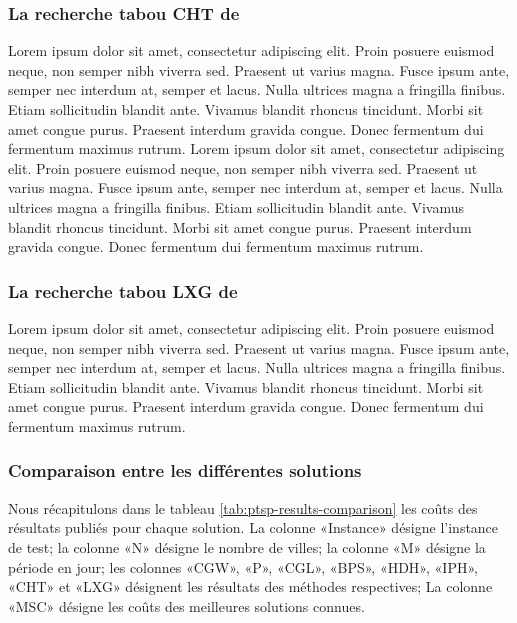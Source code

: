 \medskip


\subsubsection{La recherche tabou CHT de \parencite{cacchiani_set-covering_2014}}
Lorem ipsum dolor sit amet, consectetur adipiscing elit. Proin posuere euismod neque, non semper nibh viverra sed. Praesent ut varius magna. Fusce ipsum ante, semper nec interdum at, semper et lacus. Nulla ultrices magna a fringilla finibus. Etiam sollicitudin blandit ante. Vivamus blandit rhoncus tincidunt. Morbi sit amet congue purus. Praesent interdum gravida congue. Donec fermentum dui fermentum maximus rutrum. \parencite{hemmelmayr_variable_2009} Lorem ipsum dolor sit amet, consectetur adipiscing elit. Proin posuere euismod neque, non semper nibh viverra sed. Praesent ut varius magna. Fusce ipsum ante, semper nec interdum at, semper et lacus. Nulla ultrices magna a fringilla finibus. Etiam sollicitudin blandit ante. Vivamus blandit rhoncus tincidunt. Morbi sit amet congue purus. Praesent interdum gravida congue. Donec fermentum dui fermentum maximus rutrum.

\medskip


\subsubsection{La recherche tabou LXG de \parencite{liu_hybridization_2014}}
Lorem ipsum dolor sit amet, consectetur adipiscing elit. Proin posuere euismod neque, non semper nibh viverra sed. Praesent ut varius magna. Fusce ipsum ante, semper nec interdum at, semper et lacus. Nulla ultrices magna a fringilla finibus. Etiam sollicitudin blandit ante. Vivamus blandit rhoncus tincidunt. Morbi sit amet congue purus. Praesent interdum gravida congue. Donec fermentum dui fermentum maximus rutrum.

\medskip

\subsubsection{Comparaison entre les différentes solutions}
\label{sec:ptps-comparison}
Nous récapitulons dans le tableau \ref{tab:ptsp-results-comparison} les coûts des résultats publiés pour chaque solution. La colonne «Instance» désigne l'instance de test; la colonne «N» désigne le nombre de villes; la colonne «M» désigne la période en jour; les colonnes «CGW», «P», «CGL», «BPS», «HDH», «IPH», «CHT» et «LXG» désignent les résultats des méthodes respectives; La colonne «MSC» désigne les coûts des meilleures solutions connues.


